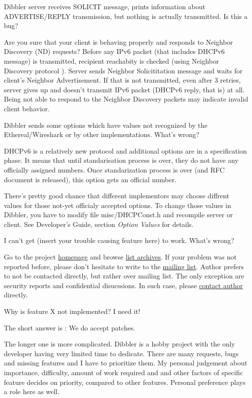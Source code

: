 \Q Dibbler server receives SOLICIT message, prints information about
ADVERTISE/REPLY transmission, but nothing is actually transmitted. Is
this a bug?

\A Are you sure that your client is behaving properly and responds to
Neighbor Discovery (ND) requests? Before any IPv6 packet (that
includes DHCPv6 message) is transmitted, recipient reachabity is
checked (using Neighbor Discovery protocol \cite{rfc4861}). Server
sends Neighbor Solicititation message and waits for client's Neighbor
Advertisement. If that is not transmitted, even after 3 retries,
server gives up and doesn't transmit IPv6 packet (DHCPv6 reply, that
is) at all. Being not able to respond to the Neighbor Discovery
packets may indicate invalid client behavior.

\Q Dibbler sends some options which have values not recognized by the
Ethereal/Wireshark or by other implementations. What's wrong?

\A DHCPv6 is a relatively new protocol and additional options are in a
specification phase. It means that until standarisation process is
over, they do not have any officially assigned numbers. Once
standarization process is over (and RFC document is released), this
option gets an official number.

There's pretty good chance that different implementors may choose
diffrent values for those not-yet officialy accepted options. To
change those values in Dibbler, you have to modify file
misc/DHCPConst.h and recompile server or client. See Developer's
Guide, section \emph{Option Values} for details.

\Q I can't get (insert your trouble causing feature here) to
work. What's wrong?

\A Go to the project \href{http://klub.com.pl/dhcpv6/}{homepage} and
browse \href{http://klub.com.pl/lists/dibbler/}{list archives}. If
your problem was not reported before, please don't hesitate to write
to the
\href{http://klub.com.pl/cgi-bin/mailman/listinfo/dibbler}{mailing
  list}. Author prefers to not be contacted directly, but rather over
mailing list. The only exception are security reports and confidential
disucssions. In such case, please \href{mailto:thomson(at)klub.com.pl}{contact author} directly.

\Q Why is feature X not implemented? I need it!

\Q The short answer is : We do accept patches.

The longer one is more complicated. Dibbler is a hobby project with
the only developer having very limited time to dedicate. There are
many requests, bugs and missing features and I have to prioritize
them. My personal judgement about importance, difficulty, amount of
work required and and other factors of specific feature decides on
priority, compared to other features. Personal preference plays a role
here as well.

